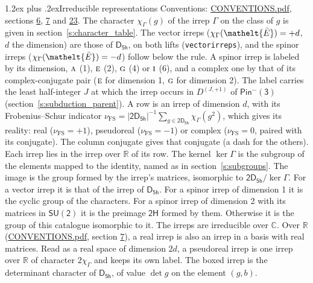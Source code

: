 \documentclass[10pt,a4paper]{article}
\makeatletter
\renewcommand\section{\@startsection{section}{1}{\z@}{-3ex plus -1ex minus -.2ex}%
  {1.2ex plus .2ex}{\normalfont\large\sffamily\bfseries\color{parttitle}}}
\numberwithin{equation}{section}
\newcommand{\eltfont}[1]{{\let\sigma\eltsigma\mathelt{#1}}}
\newcommand{\grp}[1]{\mathsf{#1}}
\newcommand{\irr}[1]{\text{\normalfont\scshape #1}}
\newcommand{\elt}[1]{\eltfont{#1}}
\newcommand{\irrJp}[2]{D^{(#1,#2)}}
\newcommand{\irchar}[1]{\chi_{#1}}
\newcommand{\fsind}{\nu_{\mathrm{FS}}}
\newcommand{\barred}[1]{\bar{#1}}
\makeatother
\begin{document}
\section{Irreducible representations}\label{s:irreps}
Conventions: \href{../../CONVENTIONS.pdf}{CONVENTIONS.pdf}, sections \href{../../../rotation/CONVENTIONS.pdf\#conv.6}{6}, \href{../../../rotation/CONVENTIONS.pdf\#conv.7}{7} and \href{../../CONVENTIONS.pdf\#conv.23}{23}.
\leavevmode\label{n:function.character}\label{n:irrep.Gamma}The character $\irchar{\Gamma}(g)$ of the irrep $\Gamma$ on the class of $g$ is given in section~\ref{s:character_table}. \label{n:index.dimension}The vector irreps ($\irchar{\Gamma}(\elt{\barred{E}}) = +d$, $d$ the dimension) are those of \href{../../../rotation/data/pdf/D5h.pdf}{$\grp{D_{5h}}$}, on both lifts (\texttt{vectorirreps}), and the spinor irreps ($\irchar{\Gamma}(\elt{\barred{E}}) = -d$) follow below the rule. A spinor irrep is labeled by its dimension, $\irr{a}$ (1), $\irr{e}$ (2), $\irr{g}$ (4) or $\irr{i}$ (6), and a complex one by that of its complex-conjugate pair ($\irr{e}$ for dimension 1, $\irr{g}$ for dimension 2). The label carries the least half-integer $J$ at which the irrep occurs in $\irrJp{J}{+1}$ of $\grp{Pin^{-}(3)}$ (section~\ref{s:subduction_parent}).
\leavevmode\label{n:index.frobenius}\label{n:head.irrep}\label{n:head.reality}A row is an irrep of dimension $d$, with its Frobenius--Schur indicator $\fsind = |\grp{2D_{5h}}|^{-1}\allowbreak\sum_{g\in\grp{2D_{5h}}}\irchar{\Gamma}(g^2)$, which gives its reality: real ($\fsind = +1$), pseudoreal ($\fsind = -1$) or complex ($\fsind = 0$, paired with its conjugate). \label{n:head.conjugate}The column conjugate gives that conjugate (a dash for the others). \label{n:head.over.real}Each irrep lies in the irrep over $\mathbb{R}$ of its row. \label{n:head.kernel}The kernel $\ker\Gamma$ is the subgroup of the elements mapped to the identity, named as in section~\ref{s:subgroups}. \label{n:head.image}The image is the group formed by the irrep's matrices, isomorphic to $\grp{2D_{5h}}/\ker\Gamma$. For a vector irrep it is that of the irrep of \href{../../../rotation/data/pdf/D5h.pdf}{$\grp{D_{5h}}$}. For a spinor irrep of dimension 1 it is the cyclic group of the characters. For a spinor irrep of dimension 2 with its matrices in $\grp{SU(2)}$ it is the preimage $\grp{2H}$ formed by them. Otherwise it is the group of this catalogue isomorphic to it. The irreps are irreducible over $\mathbb{C}$. Over $\mathbb{R}$ (\href{../../CONVENTIONS.pdf}{CONVENTIONS.pdf}, section \href{../../../rotation/CONVENTIONS.pdf\#conv.7}{7}), a real irrep is also an irrep in a basis with real matrices. Read as a real space of dimension $2d$, a pseudoreal irrep is one irrep over $\mathbb{R}$ of character $2\irchar{\Gamma}$ and keeps its own label. \label{n:mark.determinant}The boxed irrep is the determinant character of \href{../../../rotation/data/pdf/D5h.pdf}{$\grp{D_{5h}}$}, of value $\det g$ on the element $(g, b)$.
\end{document}
